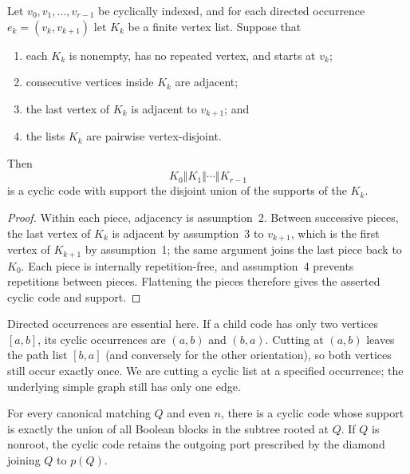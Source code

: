 \documentclass[12pt]{article}
\begin{document}
\begin{lemma}\label{lem:piece-concatenation}
Let $v_0,v_1,\ldots,v_{r-1}$ be cyclically indexed, and for each directed
occurrence $e_k=(v_k,v_{k+1})$ let $K_k$ be a finite vertex list.  Suppose
that
\begin{enumerate}
\item each $K_k$ is nonempty, has no repeated vertex, and starts at $v_k$;
\item consecutive vertices inside $K_k$ are adjacent;
\item the last vertex of $K_k$ is adjacent to $v_{k+1}$; and
\item the lists $K_k$ are pairwise vertex-disjoint.
\end{enumerate}
Then
\[
 K_0\mathbin{\Vert}K_1\mathbin{\Vert}\cdots
 \mathbin{\Vert}K_{r-1}
\]
is a cyclic code with support the disjoint union of the supports of the
$K_k$.
\end{lemma}

\begin{proof}
Within each piece, adjacency is assumption~2.  Between successive pieces,
the last vertex of $K_k$ is adjacent by assumption~3 to $v_{k+1}$, which is
the first vertex of $K_{k+1}$ by assumption~1; the same argument joins the
last piece back to $K_0$.  Each piece is internally repetition-free, and
assumption~4 prevents repetitions between pieces.  Flattening the pieces
therefore gives the asserted cyclic code and support.
\end{proof}

Directed occurrences are essential here.  If a child code
has only two vertices $[a,b]$, its cyclic occurrences are $(a,b)$ and
$(b,a)$.  Cutting at $(a,b)$ leaves the path list $[b,a]$ (and conversely for
the other orientation), so both vertices still occur exactly once.  We are
cutting a cyclic list at a specified occurrence; the underlying simple graph
still has only one edge.

\begin{lemma}\label{lem:tree-assembly}
For every canonical matching $Q$ and even $n$, there is a cyclic code whose
support is exactly the union of all Boolean blocks in the subtree rooted at
$Q$.
If $Q$ is nonroot, the cyclic code retains the outgoing port prescribed by the
diamond joining $Q$ to $p(Q)$.
\end{lemma}
\end{document}

